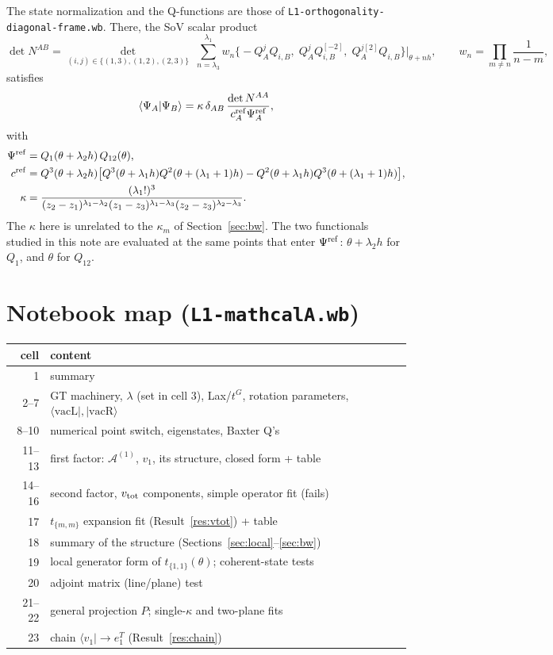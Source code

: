\documentclass[11pt]{article}
\newcommand{\vacL}{\langle\mathrm{vacL}|}
\newcommand{\vacR}{|\mathrm{vacR}\rangle}
\newcommand{\nb}[1]{\texttt{#1}}
\theoremstyle{definition}
\theoremstyle{remark}
\begin{document}
The state normalization and the Q-functions are those of \nb{L1-orthogonality-diagonal-frame.wb}. There, the SoV scalar product
\begin{equation}
\det N^{AB}=\det_{(i,j)\in\{(1,3),(1,2),(2,3)\}}\;\sum_{n=\lambda_3}^{\lambda_1}w_n\big\{-Q^j_AQ_{i,B},\;Q^j_AQ^{[-2]}_{i,B},\;Q^{j[2]}_AQ_{i,B}\big\}\big|_{\theta+nh},\qquad w_n=\prod_{m\neq n}\frac1{n-m},
\end{equation}
satisfies
\begin{equation}
\langle\Psi_A|\Psi_B\rangle=\kappa\,\delta_{AB}\,\frac{\det N^{AA}}{c^{\rm ref}_A\Psi^{\rm ref}_A},
\end{equation}
with
\begin{align}
\Psi^{\rm ref}&=Q_1(\theta+\lambda_2h)\,Q_{12}(\theta),\\
c^{\rm ref}&=Q^3(\theta+\lambda_2h)\big[Q^3(\theta+\lambda_1h)Q^2(\theta+(\lambda_1+1)h)-Q^2(\theta+\lambda_1h)Q^3(\theta+(\lambda_1+1)h)\big],\\
\kappa&=\frac{(\lambda_1!)^3}{(z_2-z_1)^{\lambda_1-\lambda_2}(z_1-z_3)^{\lambda_1-\lambda_3}(z_2-z_3)^{\lambda_2-\lambda_3}} .
\end{align}
The $\kappa$ here is unrelated to the $\kappa_m$ of Section~\ref{sec:bw}. The two functionals studied in this note are evaluated at the same points that enter $\Psi^{\rm ref}$: $\theta+\lambda_2h$ for $Q_1$, and $\theta$ for $Q_{12}$.

\section*{Notebook map (\nb{L1-mathcalA.wb})}
\begin{center}
\begin{tabular}{rl}\toprule
cell & content\\\midrule
1 & summary\\
2--7 & GT machinery, $\lambda$ (set in cell 3), Lax/$t^G$, rotation parameters, $\vacL,\vacR$\\
8--10 & numerical point switch, eigenstates, Baxter Q's\\
11--13 & first factor: $\mathcal A^{(1)}$, $v_1$, its structure, closed form + table\\
14--16 & second factor, $v_{\rm tot}$ components, simple operator fit (fails)\\
17 & $t_{\{m,m\}}$ expansion fit (Result~\ref{res:vtot}) + table\\
18 & summary of the structure (Sections~\ref{sec:local}--\ref{sec:bw})\\
19 & local generator form of $t_{\{1,1\}}(\theta)$; coherent-state tests\\
20 & adjoint matrix (line/plane) test\\
21--22 & general projection $P$; single-$\kappa$ and two-plane fits\\
23 & chain $\langle v_1|\to e_1^T$ (Result~\ref{res:chain})\\\bottomrule
\end{tabular}
\end{center}
\end{document}
